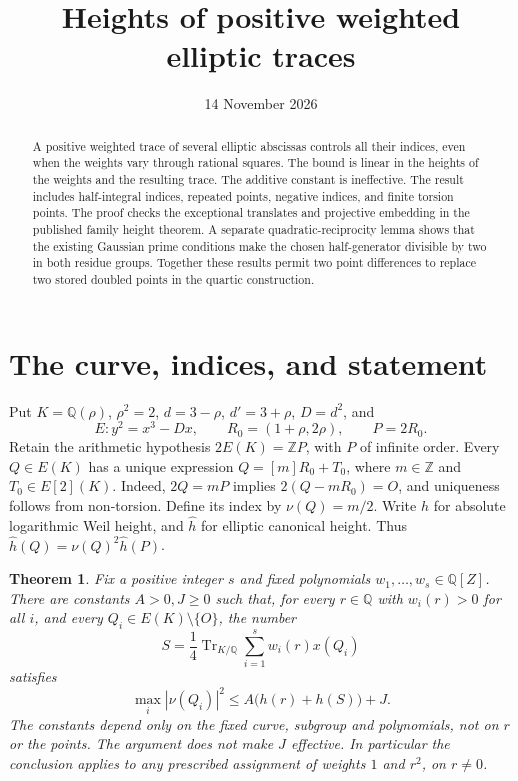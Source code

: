 \documentclass[11pt,a4paper]{article}
\title{Heights of positive weighted elliptic traces}
\author{}\date{14 November 2026}
\newtheorem{theorem}{Theorem}[section]\newtheorem{lemma}[theorem]{Lemma}\newtheorem{corollary}[theorem]{Corollary}
\newcommand{\Q}{\mathbb Q}\newcommand{\Z}{\mathbb Z}\DeclareMathOperator{\Tr}{Tr}
\begin{document}
\maketitle
\begin{abstract}
A positive weighted trace of several elliptic abscissas controls all their
indices, even when the weights vary through rational squares. The bound
is linear in the heights of the weights and the resulting trace. The
additive constant is ineffective. The result includes half-integral
indices, repeated points, negative indices, and finite torsion points.
The proof checks the exceptional translates and projective embedding in
the published family height theorem. A separate quadratic-reciprocity
lemma shows that the existing Gaussian prime conditions make the chosen
half-generator divisible by two in both residue groups. Together these
results permit two point differences to replace two stored doubled
points in the quartic construction.
\end{abstract}

\section{The curve, indices, and statement}
Put $K=\Q(\rho)$, $\rho^2=2$, $d=3-\rho$, $d'=3+\rho$,
$D=d^2$, and
\[
 E:y^2=x^3-Dx,\qquad R_0=(1+\rho,2\rho),\qquad P=2R_0.
\]
Retain the arithmetic hypothesis $2E(K)=\Z P$, with $P$ of infinite
order. Every $Q\in E(K)$ has a unique expression
$Q=[m]R_0+T_0$, where $m\in\Z$ and $T_0\in E[2](K)$.
Indeed, $2Q=mP$ implies $2(Q-mR_0)=O$, and uniqueness follows from
non-torsion. Define its index by $\nu(Q)=m/2$.
Write $h$ for absolute logarithmic Weil height, and $\widehat h$ for
elliptic canonical height. Thus
$\widehat h(Q)=\nu(Q)^2\widehat h(P)$.

\begin{theorem}\label{thm:weighted}
Fix a positive integer $s$ and fixed polynomials
$w_1,\ldots,w_s\in\Q[Z]$. There are constants $A>0,J\ge0$ such
that, for every $r\in\Q$ with $w_i(r)>0$ for all $i$, and every
$Q_i\in E(K)\setminus\{O\}$, the number
\[
 S=\frac14\Tr_{K/\Q}\sum_{i=1}^s w_i(r)x(Q_i)
\]
satisfies
\[
 \max_i|\nu(Q_i)|^2\le A\bigl(h(r)+h(S)\bigr)+J.
\]
The constants depend only on the fixed curve, subgroup and polynomials,
not on $r$ or the points. The argument does not make $J$ effective.
In particular the conclusion applies to any prescribed assignment of
weights $1$ and $r^2$, on $r\ne0$.
\end{theorem}
\end{document}

